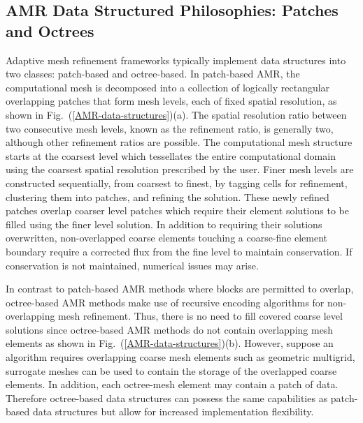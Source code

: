 \documentclass[11pt]{book}
\begin{document}
\subsection{AMR Data Structured Philosophies: Patches and Octrees}
Adaptive mesh refinement frameworks typically implement data structures into two classes: patch-based and octree-based.
In patch-based AMR, the computational mesh is decomposed into a collection of logically rectangular overlapping 
patches that form mesh levels, each of fixed spatial resolution, as shown in Fig.~(\ref{AMR-data-structures})(a). 
The spatial resolution ratio between two consecutive mesh levels, known as the refinement ratio, is generally two, 
although other refinement ratios are possible. The computational mesh structure starts at the coarsest level which 
tessellates the entire computational domain using the coarsest spatial resolution prescribed by the user. 
Finer mesh levels are constructed sequentially, from coarsest to finest, by tagging cells for refinement, 
clustering them into patches, and refining the solution. These newly refined patches overlap coarser level patches 
which require their element solutions to be filled using the finer level solution. 
In addition to requiring their solutions overwritten, non-overlapped coarse elements touching a 
coarse-fine element boundary require a corrected flux from the fine level to maintain conservation. 
If conservation is not maintained, numerical issues may arise.
\medskip

In contrast to patch-based AMR methods where blocks are permitted to overlap, octree-based AMR methods make use of recursive encoding algorithms 
for non-overlapping mesh refinement. Thus, there is no need to fill covered coarse level solutions since octree-based AMR methods do not contain 
overlapping mesh elements as shown in Fig.~(\ref{AMR-data-structures})(b). 
However, suppose an algorithm requires overlapping coarse mesh elements such as geometric multigrid, surrogate meshes can be used to contain the 
storage of the overlapped coarse elements. In addition, each octree-mesh element may contain a patch of data. 
Therefore octree-based data structures can possess the same capabilities as patch-based data structures but allow for increased implementation flexibility. 
\end{document}

